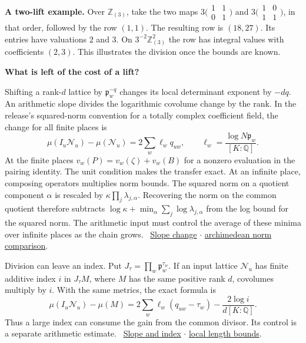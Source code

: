 \documentclass[11pt,letterpaper]{article}
\newcommand{\heading}[1]{{\sffamily\bfseries\fontsize{22}{25}\selectfont #1\par}\vspace{2pt}}
\newcommand{\links}[1]{\unskip\ {\small\sffamily\color{muted}#1}}
\newcommand{\repo}{https://github.com/TomasOrtega/RH/blob/a6ac91a412dcbaab31801355ec5707024a71bf65/extracted/lean/src/}
\newcommand{\src}[3]{\href{\repo#1.lean\#L#2}{#3}}
\newcommand{\divs}{Formalism/LocalToGlobal/Divisibility/}
\newcommand{\swin}{Formalism/SizeWindowBrackets/}
\newcommand{\NN}{\mathcal N}
\newcommand{\pp}{\mathfrak p}
\newcommand{\QQ}{\mathbb Q}
\begin{document}
\textbf{A two-lift example.} Over \(\mathbb Z_{(3)}\), take the two maps
\(3\bigl(\begin{smallmatrix}1&1\\0&1\end{smallmatrix}\bigr)\) and
\(3\bigl(\begin{smallmatrix}1&0\\1&1\end{smallmatrix}\bigr)\), in that order, followed by the row \((1,1)\). The resulting row is \((18,27)\). Its entries have valuations \(2\) and \(3\). On \(3^{-2}\mathbb Z_{(3)}^2\) the row has integral values with coefficients \((2,3)\). This illustrates the division once the bounds are known.

\newpage
{}
\heading{What is left of the cost of a lift?}
Shifting a rank-\(d\) lattice by \(\pp_w^{-q}\) changes its local determinant exponent by \(-dq\). An arithmetic slope divides the logarithmic covolume change by the rank. In the release's squared-norm convention for a totally complex coefficient field, the change for all finite places is
\[
 \mu(I_u\NN_u)-\mu(\NN_u)=2\sum_w \ell_w q_{uw},\qquad
             \ell_w=\frac{\log N\pp_w}{[K:\QQ]} .
\]
At the finite places \(v_w(P)=v_w(\zeta)+v_w(B)\) for a nonzero evaluation in the pairing identity. The unit condition makes the transfer exact. At an infinite place, composing operators multiplies norm bounds. The squared norm on a quotient component \(\alpha\) is rescaled by \(\kappa\prod_j\lambda_{j,\alpha}\). Recovering the norm on the common quotient therefore subtracts \(\log\kappa+\min_\alpha\sum_j\log\lambda_{j,\alpha}\) from the log bound for the squared norm. The arithmetic input must control the average of these minima over infinite places as the chain grows. \links{\src{Formalism/QuotientMetricDivisors/HermitianTwistDivisors/TwistedLatticeNaturality}{145}{Slope change} $\cdot$ \src{\divs ConstantGeTwentyEight}{123}{archimedean norm comparison}.}

Division can leave an index. Put \(J_\tau=\prod_w\pp_w^{\tau_w}\). If an input lattice \(\NN_u\) has finite additive index \(i\) in \(J_\tau M\), where \(M\) has the same positive rank \(d\), covolumes multiply by \(i\). With the same metrics, the exact formula is
\[
 \mu(I_u\NN_u)-\mu(M)=2\sum_w\ell_w(q_{uw}-\tau_w)
                         -\frac{2\log i}{d[K:\QQ]} .
\]
Thus a large index can consume the gain from the common divisor. Its control is a separate arithmetic estimate. \links{\src{\swin SlopesHypothesisFinitePlaces}{32}{Slope and index} $\cdot$ \src{\swin Chain2aCoreNoAnalytic}{175}{local length bounds}.}
\end{document}
